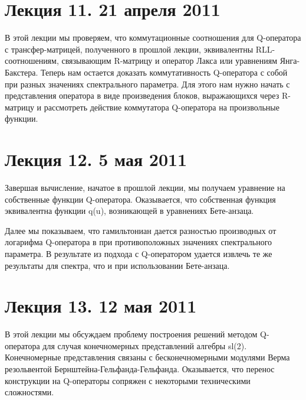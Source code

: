 \documentclass[a4paper,12pt]{article}
\theoremstyle{definition} \newtheorem{Def}{Definition}
\theoremstyle{definition}
\begin{document}
\section{Лекция 11. 21 апреля 2011}

В этой лекции мы проверяем, что коммутационные соотношения для Q-оператора с трансфер-матрицей, полученного в прошлой лекции, эквивалентны RLL-соотношениям, связывающим R-матрицу и оператор Лакса или уравнениям Янга-Бакстера. Теперь нам остается доказать коммутативность Q-оператора с собой при разных значениях спектрального параметра. Для этого нам нужно начать с представления оператора в виде произведения блоков, выражающихся через R-матрицу и рассмотреть действие коммутатора Q-оператора на произвольные функции.

\section{Лекция 12. 5 мая 2011}
Завершая вычисление, начатое в прошлой лекции, мы получаем уравнение на собственные функции Q-оператора. Оказывается, что собственная функция эквивалентна функции q(u), возникающей в уравнениях Бете-анзаца. 

Далее мы показываем, что гамильтониан дается разностью производных от логарифма Q-оператора в при противоположных значениях спектрального параметра. В результате из подхода с Q-оператором удается извлечь те же результаты для спектра, что и при использовании Бете-анзаца.

\section{Лекция 13. 12 мая 2011}

В этой лекции мы обсуждаем проблему построения решений методом Q-оператора для случая конечномерных представлений алгебры sl(2). Конечномерные представления связаны с бесконечномерными модулями Верма резольвентой Бернштейна-Гельфанда-Гельфанда.  Оказывается, что перенос конструкции на Q-операторы сопряжен с некоторыми техническими сложностями. 

{}

\end{document}
